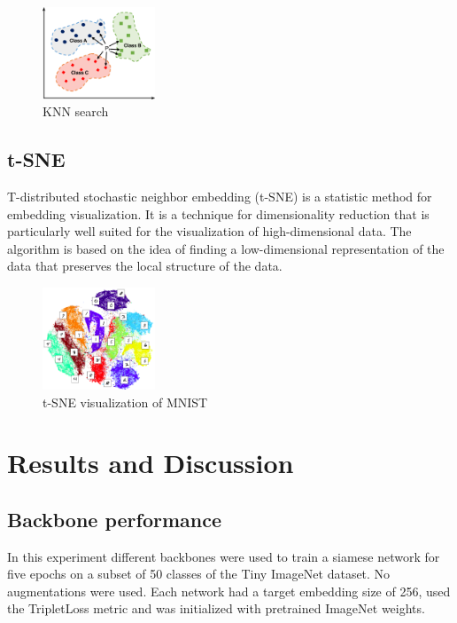 \documentclass[12pt,a4paper]{report}
\begin{document}
\begin{figure}[h]
    \centering
    \includegraphics[width=0.3\textwidth]{./images/knn.png}
	\caption{KNN search}
\end{figure}



\section{t-SNE}
T-distributed stochastic neighbor embedding (t-SNE) is a statistic method for embedding visualization.
It is a technique for dimensionality reduction that is particularly well suited for the visualization of high-dimensional data.
The algorithm is based on the idea of finding a low-dimensional representation of the data that preserves the local structure of the data.

\begin{figure}[h]
    \centering
    \includegraphics[width=0.3\textwidth]{./images/tsne-mnist.png}
	\caption{t-SNE visualization of MNIST}
\end{figure}

\chapter{Results and Discussion}

\newpage

\section{Backbone performance}
In this experiment different backbones were used to train a siamese network for five epochs on a subset of 50 classes of the Tiny ImageNet dataset.
No augmentations were used.
Each network had a target embedding size of 256, used the TripletLoss metric and was initialized with pretrained ImageNet weights.
\end{document}
